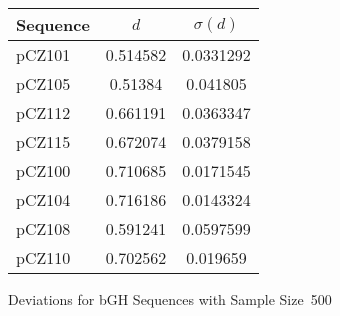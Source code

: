 \begin{cfigure}
\begin{singlespace}
    \begin{tabular}{lcc}
        \toprule
        \textbf{Sequence} & $d$ & $\sigma(d)$\\
        \midrule
        pCZ101 & 0.514582 & 0.0331292\\
        pCZ105 & 0.51384 & 0.041805\\
        pCZ112 & 0.661191 & 0.0363347\\
        pCZ115 & 0.672074 & 0.0379158\\
        \midrule
        pCZ100 & 0.710685 & 0.0171545\\
        pCZ104 & 0.716186 & 0.0143324\\
        pCZ108 & 0.591241 & 0.0597599\\
        pCZ110 & 0.702562 & 0.019659\\
        \bottomrule
    \end{tabular}
    \caption{Deviations for bGH Sequences with Sample Size~500}
    \label{bgh:deviation}
\end{singlespace}
\end{cfigure}
